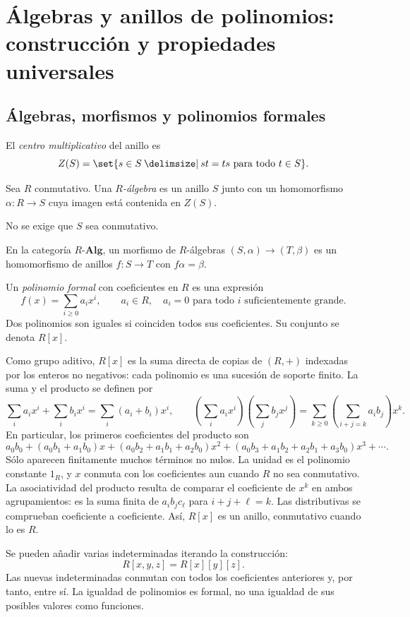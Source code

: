 \section{Álgebras y anillos de polinomios: construcción y propiedades universales}\label{sec:anillos-algebras}

\subsection{Álgebras, morfismos y polinomios formales}\label{tema:13-3-1b}\label{tema:13-3-1d}\label{tema:11-2-1}
El \emph{centro multiplicativo} del anillo es
\[
Z(S)=\set{s\in S\given st=ts\text{ para todo }t\in S}.
\]
\begin{defi}
Sea $R$ conmutativo. Una \emph{$R$-álgebra} es un anillo $S$ junto con un homomorfismo $\alpha:R\to S$ cuya imagen está contenida en $Z(S)$.
\end{defi}
No se exige que $S$ sea conmutativo.

En la categoría $R\text{-}\mathbf{Alg}$, un morfismo de $R$-álgebras $(S,\alpha)\to(T,\beta)$ es un homomorfismo de anillos $f:S\to T$ con $f\alpha=\beta$.

\begin{defi}
Un \emph{polinomio formal} con coeficientes en $R$ es una expresión
\[
f(x)=\sum_{i\geq0}a_ix^i,
\qquad a_i\in R,\quad a_i=0\text{ para todo }i\text{ suficientemente grande}.
\]
Dos polinomios son iguales si coinciden todos sus coeficientes. Su conjunto se denota $R[x]$.
\end{defi}
Como grupo aditivo, $R[x]$ es la suma directa de copias de $(R,+)$ indexadas por los enteros no negativos: cada polinomio es una sucesión de soporte finito. La suma y el producto se definen por
\[
\sum_i a_ix^i+\sum_i b_ix^i=\sum_i(a_i+b_i)x^i,
\qquad
\left(\sum_i a_ix^i\right)\left(\sum_j b_jx^j\right)
=\sum_{k\geq0}\left(\sum_{i+j=k}a_ib_j\right)x^k.
\]
En particular, los primeros coeficientes del producto son
\[
a_0b_0+(a_0b_1+a_1b_0)x
 +(a_0b_2+a_1b_1+a_2b_0)x^2
 +(a_0b_3+a_1b_2+a_2b_1+a_3b_0)x^3+\cdots.
\]
Sólo aparecen finitamente muchos términos no nulos. La unidad es el polinomio constante $1_R$, y $x$ conmuta con los coeficientes aun cuando $R$ no sea conmutativo. La asociatividad del producto resulta de comparar el coeficiente de $x^k$ en ambos agrupamientos: es la suma finita de $a_ib_jc_\ell$ para $i+j+\ell=k$. Las distributivas se comprueban coeficiente a coeficiente. Así, $R[x]$ es un anillo, conmutativo cuando lo es $R$.

Se pueden añadir varias indeterminadas iterando la construcción:
\[
R[x,y,z]=R[x][y][z].
\]
Las nuevas indeterminadas conmutan con todos los coeficientes anteriores y, por tanto, entre sí. La igualdad de polinomios es formal, no una igualdad de sus posibles valores como funciones.

